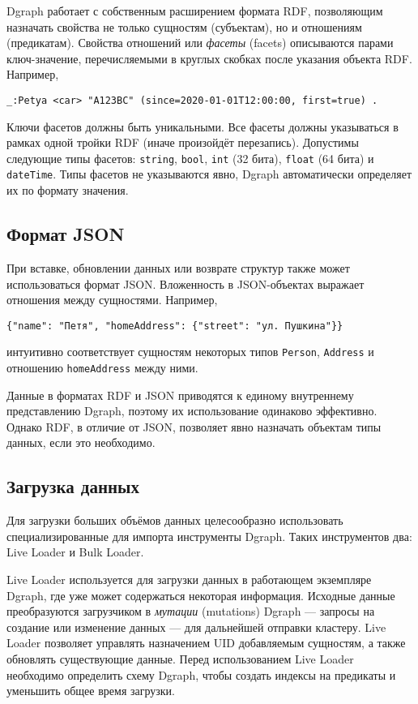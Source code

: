 Dgraph работает с собственным расширением формата RDF, позволяющим назначать свойства не только
сущностям (субъектам), но и отношениям (предикатам). Свойства отношений или \textit{фасеты} (facets) описываются парами
ключ-значение, перечисляемыми в круглых скобках после указания объекта RDF. Например,
\begin{Verbatim}
_:Petya <car> "A123BC" (since=2020-01-01T12:00:00, first=true) .
\end{Verbatim}

Ключи фасетов должны быть уникальными. Все фасеты должны указываться в рамках одной тройки RDF
(иначе произойдёт перезапись). Допустимы следующие типы фасетов: \texttt{string}, \texttt{bool},
\texttt{int} (32 бита), \texttt{float} (64 бита) и \texttt{dateTime}. Типы фасетов не указываются
явно, Dgraph автоматически определяет их по формату значения.

\subsection{Формат JSON}

При вставке, обновлении данных или возврате структур также может использоваться формат JSON.
Вложенность в JSON-объектах выражает отношения между сущностями. Например,
\begin{Verbatim}
{"name": "Петя", "homeAddress": {"street": "ул. Пушкина"}}
\end{Verbatim}
интуитивно соответствует сущностям некоторых типов \texttt{Person}, \texttt{Address} и отношению
\texttt{homeAddress} между ними.

Данные в форматах RDF и JSON приводятся к единому внутреннему представлению Dgraph, поэтому их
использование одинаково эффективно. Однако RDF, в отличие от JSON, позволяет явно назначать объектам
типы данных, если это необходимо.

\subsection{Загрузка данных}

Для загрузки больших объёмов данных целесообразно использовать специализированные для импорта
инструменты Dgraph. Таких инструментов два: Live Loader и Bulk Loader.

Live Loader используется для загрузки данных в работающем экземпляре Dgraph, где уже может содержаться
некоторая информация. Исходные данные преобразуются загрузчиком в \textit{мутации} (mutations)
Dgraph --- запросы на создание или изменение данных --- для дальнейшей отправки кластеру. Live Loader
позволяет управлять назначением UID добавляемым сущностям, а также обновлять существующие данные.
Перед использованием Live Loader необходимо определить схему Dgraph, чтобы создать индексы на предикаты
и уменьшить общее время загрузки.

